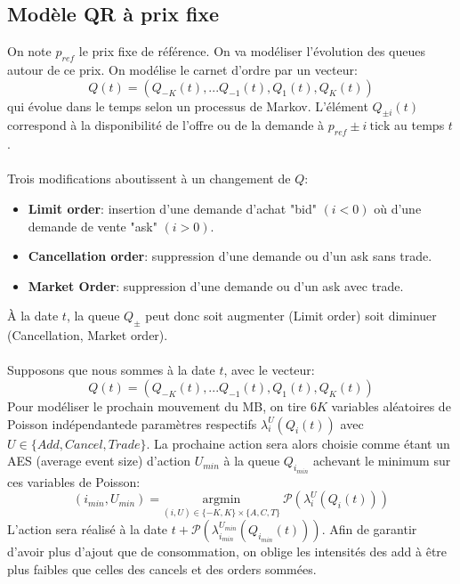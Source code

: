 \documentclass[12pt,a4paper]{article}
\theoremstyle{definition}
\theoremstyle{remark}
\begin{document}
\subsection{Modèle QR à prix fixe}
On note $p_{ref}$ le prix fixe de référence. On va modéliser l'évolution des queues autour de ce prix. On modélise le carnet d'ordre par un vecteur: $$Q(t) = (Q_{-K}(t),...Q_{-1}(t),Q_{1}(t),Q_K(t))$$ qui évolue dans le temps selon un processus de Markov. L'élément $Q_{\pm i}(t)$ correspond à la disponibilité de l'offre ou de la demande à $p_{ref}\pm i \ \text{tick}$ au temps $t$.
\\
\\Trois modifications aboutissent à un changement de $Q$:
\begin{itemize}
    \item \textbf{Limit order}: insertion d'une demande d'achat "bid" $(i<0)$ où d'une demande de vente "ask" $(i>0)$.
    \item \textbf{Cancellation order}: suppression d'une demande ou d'un ask sans trade.
    \item \textbf{Market Order}: suppression d'une demande ou d'un ask avec trade.
    \end{itemize}
À la date $t$, la queue $Q_{\pm}$ peut donc soit augmenter (Limit order) soit diminuer (Cancellation, Market order).
\\
\\ 
Supposons que nous sommes à la date $t$, avec le vecteur: $$Q(t) = (Q_{-K}(t),...Q_{-1}(t),Q_{1}(t),Q_K(t))$$ Pour modéliser le prochain mouvement du MB, on tire $6K$ variables aléatoires de Poisson indépendantede paramètres respectifs $\lambda_i^{U}(Q_i(t))$ avec $U\in \{Add,Cancel,Trade\}$. La prochaine action sera alors choisie comme étant un AES (average event size) d'action $U_{min}$ à la queue $Q_{i_{min}}$ achevant le minimum sur ces variables de Poisson:$$(i_{min},U_{min}) = \underset{(i,U) \in \{-K,K\}\times\{A,C,T\}}{\text{argmin}}\ \mathcal{P}(\lambda_i^{U}(Q_i(t)))$$
L'action sera réalisé à la date $t+\mathcal{P}(\lambda_{i_{min}}^{U_{min}}(Q_{i_{min}}(t)))$.
Afin de garantir d'avoir plus d'ajout que de consommation, on oblige les intensités des add à être plus faibles que celles des cancels et des orders sommées.
\\
\\
\hspace*{-1.5cm}
\end{document}
